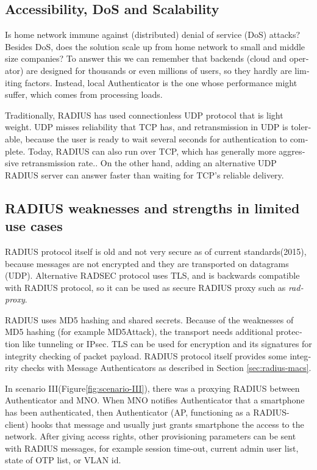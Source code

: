 \documentclass[12pt,a4paper,english]{tutthesis}
\begin{document}
\begin{otherlanguage}{english}
\subsection{Accessibility, DoS and Scalability}
\label{sec-6-4-3}

Is home network immune against (distributed) denial of service (DoS)
attacks? Besides DoS, does the solution scale up from home network to
small and middle size companies?
To answer this we can remember that backends (cloud and operator) are
designed for thousands or even millions of users, so 
they hardly are limiting factors. Instead, local
Authenticator is the one whose performance might suffer, which
comes from processing loads\cite{2009-lin-simefficiency}.


Traditionally, RADIUS has used connection\-less UDP protocol that is
light weight. UDP misses reliability that TCP has, and retransmission in UDP is
tolerable, because the user is ready to wait  several seconds for
authentication to complete. Today, RADIUS can also run over TCP, which
has generally more aggressive retransmission
rate.\cite[Section 2.2.1]{rfc5080}. 
On the other hand, adding an
alternative UDP RADIUS server can answer faster than waiting for TCP's reliable delivery.


\subsection{RADIUS weaknesses and strengths in limited use cases}
\label{sec-6-4-4}


RADIUS protocol itself is old and not very secure as of current
standards(2015), because messages are not encrypted and they are
transported on datagrams (UDP). Alternative RADSEC protocol uses TLS, and 
is backwards compatible with RADIUS protocol, so it can be used
as secure RADIUS proxy such as \emph{radproxy}\cite{uninett-radproxy}.

RADIUS uses MD5 hashing and shared secrets. Because of the weaknesses of
MD5 hashing (for example MD5Attack\cite{rfc5176}), the transport needs additional
protection like tunneling or IPsec. TLS can be used for encryption and
its signatures for integrity checking of packet payload.
RADIUS protocol itself provides some integrity checks with Message
Authenticators as described in Section \ref{sec:radius-macs}.



In scenario III(Figure\ref{fig:scenario-III}),  there was a proxying RADIUS between Authenticator
and MNO.  When MNO notifies Authenticator
that a smartphone has been authenticated, then Authenticator (AP, functioning
as a RADIUS-client) hooks that message and usually just grants
smartphone the access to the network. After giving access rights, other
provisioning parameters can be sent with RADIUS messages, for example
session time-out,
current admin user list, state of OTP list, or VLAN id.



\end{otherlanguage}
\end{document}
